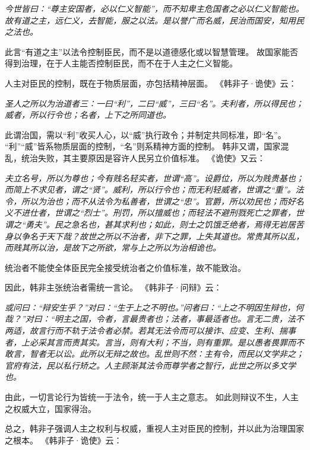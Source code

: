\documentclass[11pt]{article}
\begin{document}
\textit{今世皆曰：“尊主安国者，必以仁义智能”，而不知卑主危国者之必以仁义智能也。故有道之主，远仁义，去智能，服之以法。是以誉广而名威，民治而国安，知用民之法也。}

此言“有道之主”以法令控制臣民，而不是以道德感化或以智慧管理。
故国家能否得到治理，在于人主能否控制臣民，而不在于人主之仁义智能。

\newline

人主对臣民的控制，既在于物质层面，亦包括精神层面。
《韩非子·诡使》云：
  
\textit{圣人之所以为治道者三：一曰“利”，二曰“威”，三曰“名”。夫利者，所以得民也；威者，所以行令也；名者，上下之所同道也。}

此谓治国，需以“利”收买人心，以“威”执行政令；并制定共同标准，即“名”。
“利”“威”皆系物质层面的控制，“名”则系精神方面的控制。
韩非又谓，国家混乱，统治失败，其主要原因是容许人民另立价值标准。
《诡使》又云：

\textit{夫立名号，所以为尊也；今有贱名轻实者，世谓“高”。设爵位，所以为贱贵基也；而简上不求见者，谓之“贤”。威利，所以行令也；而无利轻威者，世谓之“重”。法令，所以为治也；而不从法令为私善者，世谓之“忠”。官爵，所以劝民也；而好名义不进仕者，世谓之“烈士”。刑罚，所以擅威也；而轻法不避刑戮死亡之罪者，世谓之“勇夫”。民之急名也，甚其求利也；如此，则士之饥饿乏绝者，焉得无岩居苦身以争名于天下哉？故世之所以不治者，非下之罪，上失其道也。常贵其所以乱，而贱其所以治，是故下之所欲，常与上之所以为治相诡也。}

统治者不能使全体臣民完全接受统治者之价值标准，故不能致治。

\newline

因此，韩非主张统治者需统一言论。
《韩非子·问辩》云：

\textit{或问曰：“辩安生乎？”对曰：“生于上之不明也。”问者曰：“上之不明因生辩也，何哉？”对曰：“明主之国，令者，言最贵者也；法者，事最适者也。言无二贵，法不两适，故言行而不轨于法令者必禁。若其无法令而可以接诈、应变、生利、揣事者，上必采其言而责其实。言当，则有大利；不当，则有重罪。是以愚者畏罪而不敢言，智者无以讼。此所以无辩之故也。乱世则不然：主有令，而民以文学非之；官府有法，民以私行矫之。人主顾渐其法令而尊学者之智行，此世之所以多文学也。}

由此，一切言论行为皆统一于法令，统一于人主之意志。
如此则辩议不生，人主之权威大立，国家得治。

\newline

总之，韩非子强调人主之权利与权威，重视人主对臣民的控制，并以此为治理国家之根本。
《韩非子·诡使》云：
\end{document}
